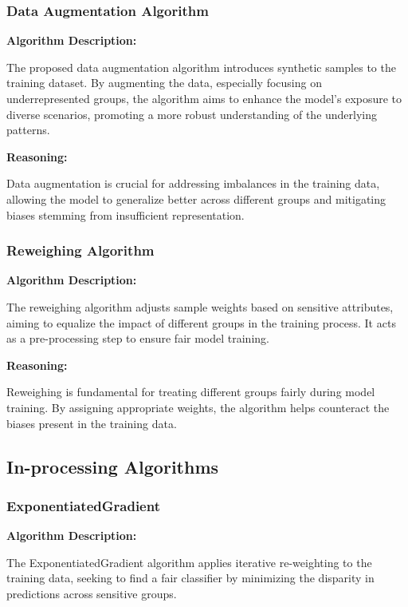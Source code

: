 \subsubsection{Data Augmentation Algorithm}

\textbf{Algorithm Description:}

The proposed data augmentation algorithm introduces synthetic samples to the training dataset. By augmenting the data, especially focusing on underrepresented groups, the algorithm aims to enhance the model's exposure to diverse scenarios, promoting a more robust understanding of the underlying patterns.

\textbf{Reasoning:}

Data augmentation is crucial for addressing imbalances in the training data, allowing the model to generalize better across different groups and mitigating biases stemming from insufficient representation.

\subsubsection{Reweighing Algorithm}

\textbf{Algorithm Description:}

The reweighing algorithm adjusts sample weights based on sensitive attributes, aiming to equalize the impact of different groups in the training process. It acts as a pre-processing step to ensure fair model training.

\textbf{Reasoning:}

Reweighing is fundamental for treating different groups fairly during model training. By assigning appropriate weights, the algorithm helps counteract the biases present in the training data.

\subsection{In-processing Algorithms}

\subsubsection{ExponentiatedGradient}

\textbf{Algorithm Description:}

The ExponentiatedGradient algorithm applies iterative re-weighting to the training data, seeking to find a fair classifier by minimizing the disparity in predictions across sensitive groups.

